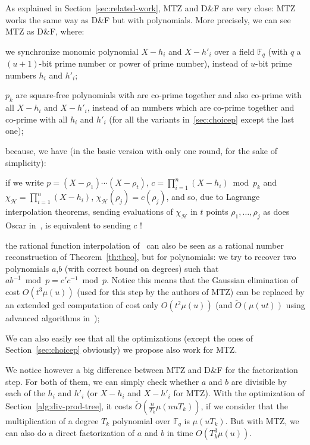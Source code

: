 \documentclass{llncs}
\newcommand{\Oapp}{\ensuremath{\tilde{O}}}
\newcommand{\Set}{\mathcal{H}}
\newcommand{\df}{D\&F\xspace}
\begin{document}
As explained in Section~\ref{sec:related-work}, MTZ and \df are very close:
MTZ works the same way as \df but with polynomials.
More precisely, we can see MTZ as \df, where:
\begin{compactitem}
\item we synchronize monomic polynomial $X-h_i$ and $X-h'_i$ over a field $\mathbb{F}_q$ (with $q$ a $(u+1)$-bit prime number or power of prime number), instead of $u$-bit prime numbers $h_i$ and $h'_i$;
\item $p_k$ are square-free polynomials with are co-prime together and also co-prime with all $X-h_i$ and $X-h'_i$, instead of an numbers which are co-prime together and co-prime with all $h_i$ and $h'_i$ (for all the variants in~\ref{sec:choicep} except the last one);
\end{compactitem}
because, we have (in the basic version with only one round, for the sake of simplicity):
\begin{compactitem}
\item if we write $p = (X-\rho_1) \cdots (X-\rho_t)$, $c = \prod_{i=1}^n (X-h_i) \bmod p_k$ and $\chi_\Set = \prod_{i=1}^n (X-h_i)$, $\chi_\Set(\rho_j) = c(\rho_j)$, and so, due to Lagrange interpolation theorems, sending evaluations of $\chi_\Set$ in $t$ points $\rho_1,\dots,\rho_j$ as does Oscar in~\cite{Mins1}, is equivalent to sending $c$ !
\item the rational function interpolation of~\cite{Mins1} can also be seen as a rational number reconstruction of Theorem~\ref{th:theo}, but for polynomials: we try to recover two polynomials $a$,$b$ (with correct bound on degrees) such that $a b^{-1} \bmod p = c' c^{-1} \bmod p$.
Notice this means that the Gaussian elimination of cost $O(t^3 \mu(u))$ (used for this step by the authors of MTZ) can be replaced by an extended gcd computation of cost only $O(t^2 \mu(u))$ (and $\Oapp(\mu(ut))$ using advanced algorithms in~\cite{pan2004rational,wang2003acceleration});
\end{compactitem}
We can also easily see that all the optimizations (except the ones of Section~\ref{sec:choicep} obviously) we propose also work for MTZ.

We notice however a big difference between MTZ and \df for the factorization step.
For both of them, we can simply check whether $a$ and $b$ are divisible by each of the $h_i$ and $h'_i$ (or $X-h_i$ and $X - h'_i$ for MTZ).
With the optimization of Section~\ref{alg:div-prod-tree}, it costs $\Oapp(\frac{n}{T_k} \mu(nuT_k))$, if we consider that the multiplication of a degree $T_k$ polynomial over $\mathbb{F}_q$ is $\mu(uT_k)$.
But with MTZ, we can also do a direct factorization of $a$ and $b$ in time $O(T_k^3 \mu(u))$.
\end{document}
